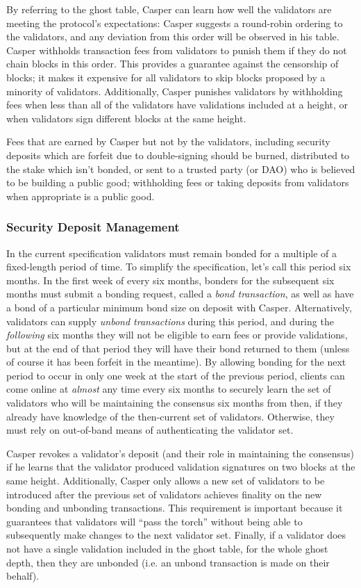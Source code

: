 \documentclass[11pt,a4paper]{article}
\begin{document}
By referring to the ghost table, Casper can learn how well the validators are meeting the protocol's expectations: Casper suggests a round-robin ordering to the validators, and any deviation from this order will be observed in his table. Casper withholds transaction fees from validators to punish them if they do not chain blocks in this order. This provides a guarantee against the censorship of blocks; it makes it expensive for all validators to skip blocks proposed by a minority of validators. Additionally, Casper punishes validators by withholding fees when less than all of the validators have validations included at a height, or when validators sign different blocks at the same height.

Fees that are earned by Casper but not by the validators, including security deposits which are forfeit due to double-signing should be burned, distributed to the stake which isn't bonded, or sent to a trusted party (or DAO) who is believed to be building a public good; withholding fees or taking deposits from validators when appropriate is a public good.


\subsubsection{Security Deposit Management}

In the current specification validators must remain bonded for a multiple of a fixed-length period of time. To simplify the specification, let's call this period six months. In the first week of every six months, bonders for the subsequent six months must submit a bonding request, called a \emph{bond transaction}, as well as have a bond of a particular minimum bond size on deposit with Casper. Alternatively, validators can supply \emph{unbond transactions} during this period, and during the \emph{following} six months they will not be eligible to earn fees or provide validations, but at the end of that period they will have their bond returned to them (unless of course it has been forfeit in the meantime). By allowing bonding for the next period to occur in only one week at the start of the previous period, clients can come online at \emph{almost} any time every six months to securely learn the set of validators who will be maintaining the consensus six months from then, if they already have knowledge of the then-current set of validators. Otherwise, they must rely on out-of-band means of authenticating the validator set. 

Casper revokes a validator's deposit (and their role in maintaining the consensus) if he learns that the validator produced validation signatures on two blocks at the same height. Additionally, Casper only allows a new set of validators to be introduced after the previous set of validators achieves finality on the new bonding and unbonding transactions. This requirement is important because it guarantees that validators will ``pass the torch'' without being able to subsequently make changes to the next validator set. Finally, if a validator does not have a single validation included in the ghost table, for the whole ghost depth, then they are unbonded (i.e. an unbond transaction is made on their behalf).
\end{document}
